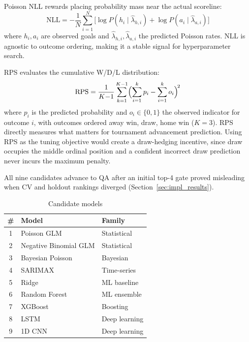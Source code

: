 \documentclass[conference]{IEEEtran}
\begin{document}
Poisson NLL rewards placing probability mass near the actual
scoreline:
\begin{equation}
  \text{NLL} = -\frac{1}{N}\sum_{i=1}^{N}
  \bigl[\log P(h_i \mid \hat{\lambda}_{h,i})
       + \log P(a_i \mid \hat{\lambda}_{a,i})\bigr]
\end{equation}
where $h_i, a_i$ are observed goals and $\hat{\lambda}_{h,i},
\hat{\lambda}_{a,i}$ the predicted Poisson rates.
NLL is agnostic to outcome ordering, making it a stable signal for
hyperparameter search.

RPS evaluates the cumulative W/D/L distribution:
\begin{equation}
  \text{RPS} = \frac{1}{K{-}1} \sum_{k=1}^{K-1}
  \Bigl( \sum_{i=1}^{k} p_i - \sum_{i=1}^{k} o_i \Bigr)^{\!2}
\end{equation}
where $p_i$ is the predicted probability and $o_i \in \{0,1\}$ the observed
indicator for outcome $i$, with outcomes ordered away win, draw, home win
($K{=}3$).
RPS directly measures what matters for tournament advancement prediction.
Using RPS as the tuning objective would create a draw-hedging incentive,
since draw occupies the middle ordinal position and a confident incorrect
draw prediction never incurs the maximum penalty.

All nine candidates advance to QA after an initial top-4 gate proved
misleading when CV and holdout rankings diverged
(Section~\ref{sec:impl_results}).


\begin{table}[h]
  \caption{Candidate models}
  \label{tab:models}
  \begin{tabular}{@{}cll@{}}
    \toprule
    \# & Model & Family \\
    \midrule
    1 & Poisson GLM & Statistical \\
    2 & Negative Binomial GLM & Statistical \\
    3 & Bayesian Poisson & Bayesian \\
    4 & SARIMAX & Time-series \\
    5 & Ridge & ML baseline \\
    6 & Random Forest & ML ensemble \\
    7 & XGBoost & Boosting \\
    8 & LSTM & Deep learning \\
    9 & 1D CNN & Deep learning \\
    \bottomrule
  \end{tabular}
\end{table}
\end{document}

